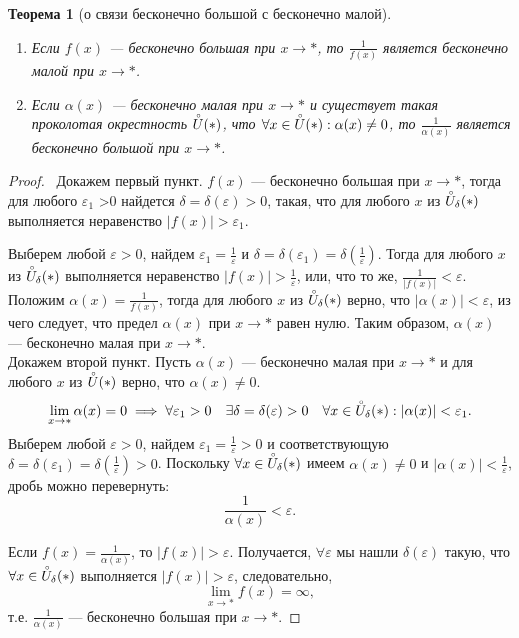 \documentclass[a4paper,12pt]{article} %
\newtheorem{theorem}{Теорема}[section]
\theoremstyle{remark}
\theoremstyle{definition}
\begin{document}
\begin{theorem}[о связи бесконечно большой с бесконечно малой]\ 
	\begin{enumerate}
		\item Если $f(x)$ --- бесконечно большая при $x\to *$, то $\frac{1}{f(x)}$ является бесконечно малой при $x\to *$.
		\item Если $\alpha(x)$ --- бесконечно малая при $x \to *$ и существует такая проколотая окрестность $\accentset{\circ}{U}(*)$, что $\forall x \in  \accentset{\circ}{U}(*) : \alpha(x) \neq 0$, то $\frac{1}{\alpha(x)}$ является бесконечно большой при $x\to *$.
	\end{enumerate}		
\end{theorem}
\begin{proof}\
    Докажем первый пункт. $f(x)$ --- бесконечно большая при $x \to *$, тогда для любого $\varepsilon_1$ >0 
    найдется $\delta=\delta(\varepsilon)>0$, такая, что для любого $x$ из $\accentset{\circ}{U}_\delta(*)$
    выполняется неравенство $|f(x)|>\varepsilon_1$.

    Выберем любой $\varepsilon>0$, найдем $\varepsilon_1=\frac{1}{\varepsilon}$ и 
    $\delta=\delta(\varepsilon_1)=\delta(\frac{1}{\varepsilon})$. 
    Тогда для любого $x$ из $\accentset{\circ}{U}_\delta(*)$ выполняется неравенство $|f(x)|>\frac{1}{\varepsilon}$,
    или, что то же, $\frac{1}{|f(x)|} < \varepsilon$. Положим $\alpha(x) = \frac{1}{f(x)}$,
    тогда для любого $x$ из $\accentset{\circ}{U}_\delta(*)$ верно, что $|\alpha(x)| < \varepsilon$,
    из чего следует, что предел $\alpha(x)$ при $x\to *$ равен нулю.
    Таким образом, $\alpha(x)$ --- бесконечно малая при $x\to *$.
    \\[12pt]
	Докажем второй пункт.
    Пусть $\alpha(x)$ --- бесконечно малая при $x\to *$ и для любого $x$ из $\accentset{\circ}{U}(*)$ верно,
    что $\alpha(x)\neq 0$. 
    \[\lim_{x \to *} \alpha(x) = 0 \implies\forall \varepsilon_1>0 \quad \exists \delta=\delta(\varepsilon)>0 \quad
    \forall x\in \accentset{\circ}{U}_\delta(*) : |\alpha(x)| < \varepsilon_1.\] 
    Выберем любой $\varepsilon>0$, найдем $\varepsilon_1=\frac{1}{\varepsilon}>0$ и соответствующую 
    $\delta=\delta(\varepsilon_1)=\delta(\frac{1}{\varepsilon})>0$. Поскольку $\forall x\in \accentset{\circ}{U}_\delta(*)$
    имеем $\alpha(x)\neq 0$ и $\displaystyle |\alpha(x)| < \frac{1}{\varepsilon}$, дробь можно перевернуть:
    \[\frac{1}{\alpha(x)} < \varepsilon.\] 

    Если $\displaystyle f(x) = \frac{1}{\alpha(x)}$, то $|f(x)|>\varepsilon$. Получается,  $\forall \varepsilon$ мы нашли
    $\delta(\varepsilon)$ такую, что $\forall x\in \accentset{\circ}{U}_\delta(*)$ выполняется $|f(x)|>\varepsilon$,
    следовательно,
    \[\lim_{x \to *} f(x) = \infty,\] 
    т.е. $\displaystyle \frac{1}{\alpha(x)}$ --- бесконечно большая при $x\to *$.
\end{proof}
\end{document}
